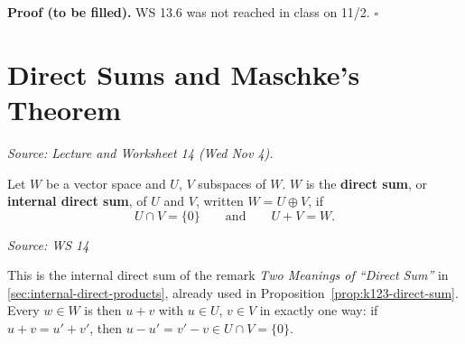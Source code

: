 \documentclass[11pt]{report}
\renewenvironment{proof}[1][Proof]{\noindent\textbf{#1.} }{\hfill$\square$\par\vspace{5pt}}
\newcommand{\srcline}[1]{\par\hfill{\footnotesize\textit{Source: #1}}}
\begin{document}
\begin{proof}[Proof (to be filled)]
WS 13.6 was not reached in class on 11/2.
\end{proof}


\section{Direct Sums and Maschke's Theorem}\label{sec:maschke}

\textit{Source: Lecture and Worksheet 14 (Wed Nov 4).}

\begin{defbox}\label{def:internal-direct-sum-subspaces}
Let $W$ be a vector space and $U$, $V$ subspaces of $W$. $W$ is the \textbf{direct sum}, or \textbf{internal direct sum}, of $U$ and $V$, written $W = U \oplus V$, if
\[ U \cap V = \{0\} \qquad \text{and} \qquad U + V = W. \]
\srcline{WS 14}
\end{defbox}

This is the internal direct sum of the remark \emph{Two Meanings of ``Direct Sum''} in \ref{sec:internal-direct-products}, already used in Proposition~\ref{prop:k123-direct-sum}. Every $w \in W$ is then $u + v$ with $u \in U$, $v \in V$ in exactly one way: if $u + v = u' + v'$, then $u - u' = v' - v \in U \cap V = \{0\}$.
\end{document}
